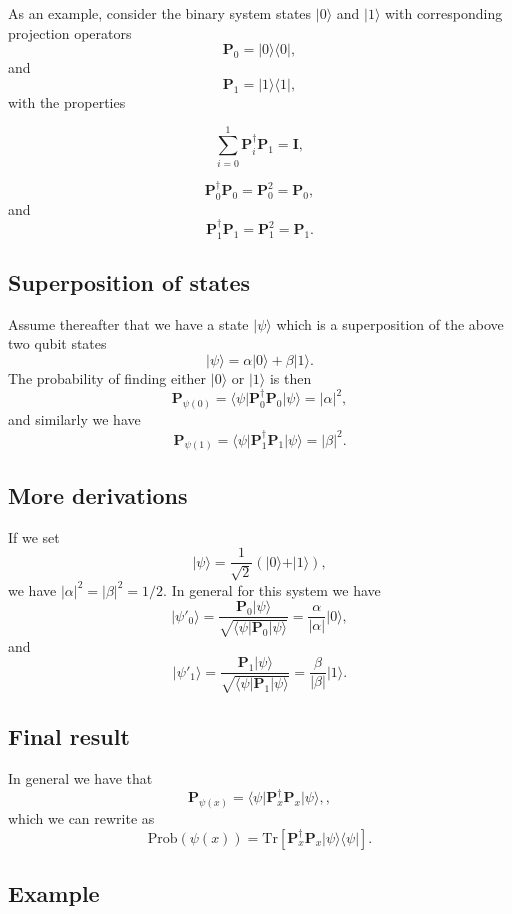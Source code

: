As an example, consider the binary system states $\vert 0\rangle$ and $\vert 1\rangle$ with corresponding projection operators
\[
\bm{P}_0 =\vert 0 \rangle \langle 0\vert,
\]
and 
\[
\bm{P}_1 =\vert 1 \rangle \langle 1\vert,
\]
with the properties

\[
\sum_{i=0}^1\bm{P}_i^{\dagger}\bm{P}_1=\bm{I},
\]

\[
\bm{P}_0^{\dagger}\bm{P}_0=\bm{P}_0^2=\bm{P}_0,
\]
and
\[
\bm{P}_1^{\dagger}\bm{P}_1=\bm{P}_1^2=\bm{P}_1.
\]

\subsection{Superposition of states}

Assume thereafter that we have a state $\vert \psi\rangle$ which is a superposition of the above two qubit states
\[
\vert \psi \rangle = \alpha\vert 0 \rangle + \beta \vert 1\rangle.
\]
The probability of finding either $\vert 0\rangle$ or $\vert 1\rangle$ is then
\[
\bm{P}_{\psi(0)}=\langle \psi\vert \bm{P}_0^{\dagger}\bm{P}_0\vert \psi\rangle=\vert \alpha\vert^2,
\]
and similarly we have 
\[
\bm{P}_{\psi(1)}=\langle \psi\vert \bm{P}_1^{\dagger}\bm{P}_1\vert \psi\rangle=\vert \beta\vert^2.
\]
\subsection{More derivations}

If we set 
\[
\vert \psi \rangle = \frac{1}{\sqrt{2}}\left(\vert 0 \rangle + \vert 1\rangle\right),
\]
we have $\vert \alpha\vert^2=\vert \beta\vert^2=1/2$. In general for this system we have
\[
\vert \psi'_0\rangle = \frac{\bm{P}_0\vert \psi\rangle}{\sqrt{\langle \psi \vert \bm{P}_0\vert \psi\rangle}}=\frac{\alpha}{\vert \alpha\vert}\vert 0 \rangle,
\]
and
\[
\vert \psi'_1\rangle = \frac{\bm{P}_1\vert \psi\rangle}{\sqrt{\langle \psi \vert \bm{P}_1\vert \psi\rangle}}=\frac{\beta}{\vert \beta\vert}\vert 1 \rangle. 
\]

\subsection{Final result}
In general we have that 
\[
\bm{P}_{\psi(x)}=\langle \psi\vert \bm{P}_x^{\dagger}\bm{P}_x\vert \psi\rangle,,
\]
which we can rewrite as
\[
\mathrm{Prob}(\psi(x))=\mathrm{Tr}\left[\bm{P}_x^{\dagger}\bm{P}_x\vert \psi\rangle\langle \psi\vert\right].
\]

\subsection{Example}

